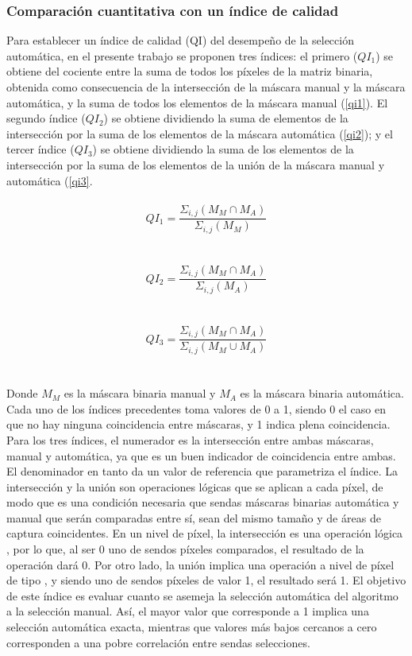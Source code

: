 \subsubsection{Comparación cuantitativa con un índice de calidad}
Para establecer un índice de calidad (QI) del desempeño de la selección automática, en el presente trabajo se proponen tres índices: el primero ($QI_1$) se obtiene del cociente entre la suma de todos los píxeles de la matriz binaria, obtenida como consecuencia de la intersección de la máscara manual y la máscara automática, y la suma de todos los elementos de la máscara manual (\ref{qi1}). El segundo índice ($QI_2$) se obtiene dividiendo la suma de elementos de la intersección por la suma de los elementos de la máscara automática (\ref{qi2}); y el tercer índice ($QI_3$) se obtiene dividiendo la suma de los elementos de la intersección por la suma de los elementos de la unión de la máscara manual y automática (\ref{qi3}.
\\
\\
 \begin{equation}
    QI_1=\frac{\Sigma _{i,j}(M_M\cap M_A )}{\Sigma _{i,j}(M_M ) }
    \label{qi1}
\end{equation}
\\
\\
 \begin{equation}
    QI_2=\frac{\Sigma _{i,j}(M_M\cap M_A )}{\Sigma _{i,j}(M_A ) }
    \label{qi2}
\end{equation}
\\
\\
\begin{equation}
    QI_3=\frac{\Sigma _{i,j}(M_M\cap M_A )}{\Sigma _{i,j}(M_M \cup M_A ) }
    \label{qi3}
\end{equation}
\\
\\
Donde $M_M$ es la máscara binaria manual y $M_A$ es la máscara binaria automática. Cada uno de los índices precedentes toma valores de 0 a 1, siendo 0 el caso en que no hay ninguna coincidencia entre máscaras, y 1 indica plena coincidencia. Para los tres índices, el numerador es la intersección entre ambas máscaras, manual y automática, ya que es un buen indicador de coincidencia entre ambas. El denominador en tanto da un valor de referencia que parametriza el índice. La intersección y la unión son operaciones lógicas que se aplican a cada píxel, de modo que es una condición necesaria que sendas máscaras binarias automática y manual que serán comparadas entre sí, sean del mismo tamaño y de áreas de captura coincidentes. En un nivel de píxel, la intersección es una operación lógica , por lo que, al ser 0 uno de sendos píxeles comparados, el resultado de la operación dará 0. Por otro lado, la unión implica una operación a nivel de píxel de tipo , y siendo uno de sendos píxeles de valor 1, el resultado será 1. El objetivo de este índice es evaluar cuanto se asemeja la selección automática del algoritmo a la selección manual. Así, el mayor valor que corresponde a 1 implica una selección automática exacta, mientras que valores más bajos cercanos a cero corresponden a una pobre correlación entre sendas selecciones.


